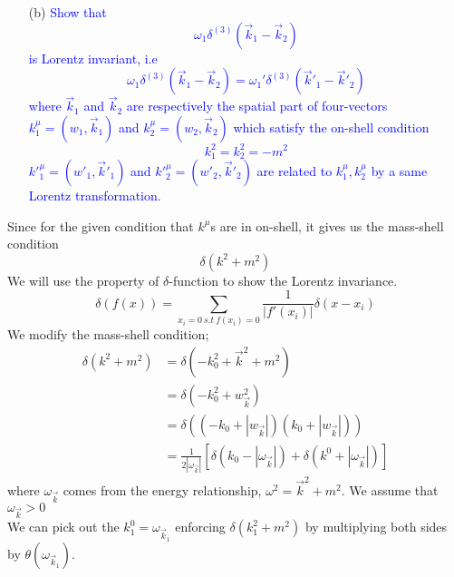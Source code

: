 \documentclass[11pt, a4paper]{article}
\begin{document}
\newpage
\begin{enumerate}
    \item [(b)] \textcolor{blue}{
    Show that
    \begin{equation}\label{eqn:2.3}
        \omega_1 \delta^{(3)}(\vec{k}_1 - \vec{k}_2)
    \end{equation}
    is Lorentz invariant, i.e
    \begin{equation}\label{eqn:2.4}
        \omega_1 \delta^{(3)}(\vec{k}_1 - \vec{k}_2) = \omega_1' \delta^{(3)}(\vec{k}'_1 - \vec{k}'_2)
    \end{equation}
    where $\vec{k}_1$ and $\vec{k}_2$ are respectively the spatial part of four-vectors $k^\mu_1 = (w_1, \vec{k}_1)$ and $k^\mu_2 = (w_2, \vec{k}_2)$ which satisfy the on-shell condition
    \begin{equation}\label{eqn:2.5}
        k^2_1 = k^2_2 = -m^2
    \end{equation}
    $k'^\mu_1  = (w'_1, \vec{k}'_1)$ and $k'^\mu_2 = (w'_2, \vec{k}'_2)$ are related to $k^\mu_1, k^\mu_2$ by a same Lorentz transformation.
    }
\end{enumerate}
Since for the given condition that $k^\mu$s are in on-shell, it gives us the mass-shell condition
\begin{equation}
    \delta(k^2 + m^2)
\end{equation}
We will use the property of $\delta$-function to show the Lorentz invariance.
\begin{equation}
    \delta(f(x)) = \sum_{x_i = 0\  s.t \ f(x_i) = 0} \frac{1}{|f'(x_i)|}\delta(x-x_i)
\end{equation}
We modify the mass-shell condition;
\begin{align}
    \delta(k^2 + m^2) & = \delta(-k^2_0 + \vec{k}^2 + m^2) \\
    & = \delta(-k^2_0 + w^2_{\vec{k}}) \\
    & = \delta((-k_0 + |w_{\vec{k}}|)(k_0 + |w_{\vec{k}}|)) \\
    & = \frac{1}{2|\omega_{\vec{k}}|} \left[ \delta(k_0 - |\omega_{\vec{k}}|) + \delta(k^0 + |\omega_{\vec{k}}|) \right]
\end{align}
where $\omega_{\vec{k}}$ comes from the energy relationship, $\omega^2 = \vec{k}^2 + m^2$.
We assume that $\omega_{\vec{k}} > 0$\\
We can pick out the $k^0_1 = \omega_{\vec{k}_1}$ enforcing $\delta(k^2_1 + m^2)$ by multiplying both sides by $\theta(\omega_{\vec{k}_1})$.
\end{document}
